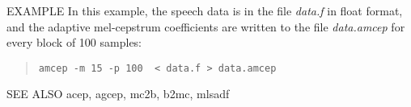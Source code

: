 \begin{qsection}{EXAMPLE}
	In this example, the speech data is in the file {\em data.f}
        in float format, and the adaptive mel-cepstrum coefficients
        are written to
        the file {\em data.amcep} for every block of 100 samples:
\begin{quote}
 \verb!amcep -m 15 -p 100  < data.f > data.amcep!
\end{quote} 
\end{qsection}

\begin{qsection}{SEE ALSO}
acep, agcep, mc2b, b2mc, mlsadf
\end{qsection}
